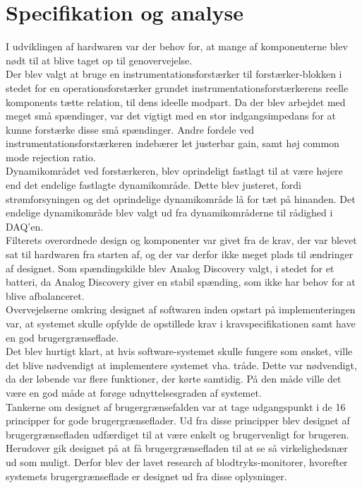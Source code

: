 \section{Specifikation og analyse}
I udviklingen af hardwaren var der behov for, at mange af komponenterne blev nødt til at blive taget op til genovervejelse. \\
Der blev valgt at bruge en instrumentationsforstærker til forstærker-blokken i stedet for en operationsforstærker grundet instrumentationsforstærkerens reelle komponents tætte relation, til dens ideelle modpart. Da der blev arbejdet med meget små spændinger, var det vigtigt med en stor indgangsimpedans for at kunne forstærke disse små spændinger. Andre fordele ved instrumentationsforstærkeren indebærer let justerbar gain, samt høj common mode rejection ratio. \\
Dynamikområdet ved forstærkeren, blev oprindeligt fastlagt til at være højere end det endelige fastlagte dynamikområde. Dette blev justeret, fordi strømforsyningen og det oprindelige dynamikområde lå for tæt på hinanden. Det endelige dynamikområde blev valgt ud fra dynamikområderne til rådighed i DAQ'en. \\
Filterets overordnede design og komponenter var givet fra de krav, der var blevet sat til hardwaren fra starten af, og der var derfor ikke meget plads til ændringer af designet. Som spændingskilde blev Analog Discovery valgt, i stedet for et batteri, da Analog Discovery giver en stabil spænding, som ikke har behov for at blive afbalanceret. \\

Overvejelserne omkring designet af softwaren inden opstart på implementeringen var, at systemet skulle opfylde de opstillede krav i kravspecifikationen samt have en god brugergrænseflade.\\
Det blev hurtigt klart, at hvis software-systemet skulle fungere som ønsket, ville det blive nødvendigt at implementere systemet vha. tråde. Dette var nødvendigt, da der løbende var flere funktioner, der kørte samtidig. På den måde ville det være en god måde at forøge udnyttelsesgraden af systemet.\\
Tankerne om designet af brugergrænsefalden var at tage udgangspunkt i de 16 principper for gode brugergrænseflader.\cite{Usability} Ud fra disse principper blev designet af brugergrænsefladen udfærdiget til at være enkelt og brugervenligt for brugeren. Herudover gik designet på at få brugergrænsefladen til at se så virkelighedsnær ud som muligt. Derfor blev der lavet research af blodtryks-monitorer, hvorefter systemets brugergrænseflade er designet ud fra disse oplysninger. 

